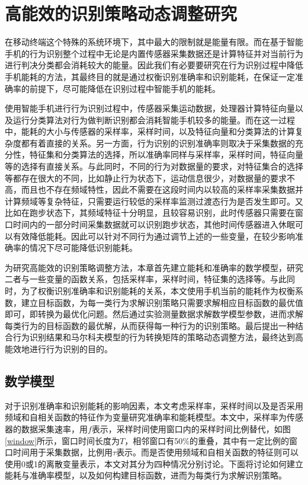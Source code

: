 ﻿\chapter{高能效的识别策略动态调整研究}
\par 在移动终端这个特殊的系统环境下，其中最大的限制就是能量有限。而在基于智能手机的行为识别整个过程中无论是内置传感器采集数据还是计算特征并对当前行为进行判决分类都会消耗较大的能量。因此我们有必要要研究在行为识别过程中降低手机能耗的方法，其最终目的就是通过权衡识别准确率和识别能耗，在保证一定准确率的前提下，尽可能降低在识别过程中智能手机的能耗。
\par 使用智能手机进行行为识别过程中，传感器采集运动数据，处理器计算特征向量以及运行分类算法对行为做判断识别都会消耗智能手机较多的能量。而在这一过程中，能耗的大小与传感器的采样率，采样时间，以及特征向量和分类算法的计算复杂度都有着直接的关系。另一方面，行为识别的识别准确率则取决于采集数据的充分性，特征集和分类算法的选择，所以准确率同样与采样率，采样时间，特征向量等的选择有直接关系。与此同时，不同的行为对数据量的要求，对特征集合的选择等都存在很大的不同，比如静止行为状态下，运动信息很少，对数据量的要求不高，而且也不存在频域特性，因此不需要在这段时间内以较高的采样率采集数据并计算频域等复杂特征，只需要运行较低的采样率监测过渡态行为是否发生即可。又比如在跑步状态下，其频域特征十分明显，且较容易识别，此时传感器只需要在窗口时间内的一部分时间采集数据就可以识别跑步状态，其他时间传感器进入休眠可以有效降低能耗。因此可以针对不同行为通过调节上述的一些变量，在较少影响准确率的情况下尽可能降低识别能耗。
\par 为研究高能效的识别策略调整方法，本章首先建立能耗和准确率的数学模型，研究二者与一些变量的函数关系，包括采样率，采样时间，特征集的选择等。与此同时，为了权衡识别准确率和识别能耗的关系，本文使用手机当前的能耗作为权衡系数，建立目标函数，为每一类行为求解识别策略只需要求解相应目标函数的最优值即可，即转换为最优化问题。然后通过实验测量数据求解数学模型参数，进而求解每类行为的目标函数的最优解，从而获得每一种行为的识别策略。最后提出一种结合行为识别结果和马尔科夫模型的行为转换矩阵的策略动态调整方法，最终达到高能效地进行行为识别的目的。

\section{数学模型}
\par 对于识别准确率和识别能耗的影响因素，本文考虑采样率，采样时间以及是否采用频域和自相关函数的特征作为变量研究准确率和能耗模型。本文中，采样率为传感器的数据采集速率，用$f$表示，采样时间使用窗口内的采样时间比例替代，如图\ref{window}所示，窗口时间长度为$T$，相邻窗口有50\%的重叠，其中有一定比例的窗口时间用于采集数据，比例用$\tau$表示。而是否使用频域和自相关函数的特征则可以使用0或1的离散变量表示，本文对其分为四种情况分别讨论。下面将讨论如何建立能耗与准确率模型，以及如何构建目标函数，进而为每类行为求解识别策略。

